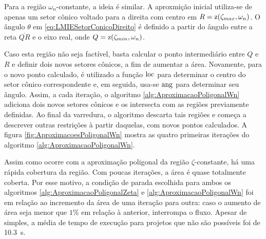 Para a região $\omega_n$-constante, a ideia é similar. A aproxmição inicial utiliza-se de apenas um setor cônico voltado para a direita com centro em $R = \operatorname{\mathrm{z}}(\zeta_{max},\omega_n)$. O ângulo $\theta$ em \eqref{eq:LMIESetorConicoDireito} é definido a partir do ângulo entre a reta $\overline{QR}$ e o eixo real, onde $Q = \operatorname{\mathrm{z}}(\zeta_{min},\omega_n)$.

Caso esta região não seja factível, basta calcular o ponto intermediário entre $Q$ e $R$ e definir dois novos setores cônicos, a fim de aumentar a área. Novamente, para o novo ponto calculado, é utilizado a função $\operatorname{loc}$ para determinar o centro do setor cônico correspondente e, em seguida, usa-se $\operatorname{ang}$ para determinar seu ângulo. Assim, a cada iteração, o algoritmo \ref{alg:AproximacaoPoligonalWn} adiciona dois novos setores cônicos e os intersecta com as regiões previamente definidas. Ao final da varredura, o algoritmo descarta tais regiões e começa a descrever outras restrições à partir daquelas, com novos pontos calculados. A figura \ref{fig:AproximacoesPoligonalWn} mostra as quatro primeiras iterações do algoritmo \ref{alg:AproximacaoPoligonalWn}.

Assim como ocorre com a aproximação poligonal da região $\zeta$-constante, há uma rápida cobertura da região. Com poucas iterações, a área é quase totalmente coberta. Por esse motivo, a condição de parada escolhida para ambos os algoritmos \ref{alg:AproximacaoPoligonalZeta} e \ref{alg:AproximacaoPoligonalWn} foi em relação ao incremento da área de uma iteração para outra: caso o aumento de área seja menor que $1\%$ em relação à anterior, interrompa o fluxo. Apesar de simples, a média de tempo de execução para projetos que não são possíveis foi de \SI{10.3}{\second}.

